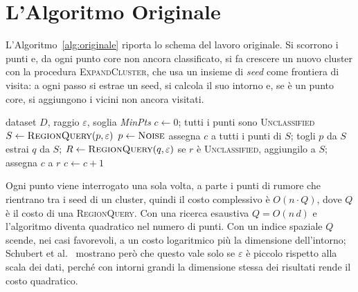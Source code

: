\section{L'Algoritmo Originale}

L'Algoritmo~\ref{alg:originale} riporta lo schema del lavoro originale. Si scorrono i punti e, da ogni punto core non ancora classificato, si fa crescere un nuovo cluster con la procedura \textsc{ExpandCluster}, che usa un insieme di \emph{seed} come frontiera di visita: a ogni passo si estrae un seed, si calcola il suo intorno e, se è un punto core, si aggiungono i vicini non ancora visitati.

\begin{algorithm}[H]
\caption{DBSCAN nella formulazione di Ester et al.~\cite{ester1996}}
\label{alg:originale}
\begin{algorithmic}[1]
\Require dataset $D$, raggio $\varepsilon$, soglia \textit{MinPts}
\State $c \gets 0$; tutti i punti sono \textsc{Unclassified}
        \State $S \gets \textsc{RegionQuery}(p, \varepsilon)$
            \State $p \gets \textsc{Noise}$ 
        \Else
            \State assegna $c$ a tutti i punti di $S$; togli $p$ da $S$
                \State estrai $q$ da $S$; $R \gets \textsc{RegionQuery}(q, \varepsilon)$
                        \State se $r$ è \textsc{Unclassified}, aggiungilo a $S$; assegna $c$ a $r$
                    \EndFor
                \EndIf
            \EndWhile
            \State $c \gets c + 1$
        \EndIf
    \EndIf
\EndFor
\end{algorithmic}
\end{algorithm}

Ogni punto viene interrogato una sola volta, a parte i punti di rumore che rientrano tra i seed di un cluster, quindi il costo complessivo è $O(n \cdot Q)$, dove $Q$ è il costo di una \textsc{RegionQuery}. Con una ricerca esaustiva $Q = O(n\,d)$ e l'algoritmo diventa quadratico nel numero di punti. Con un indice spaziale $Q$ scende, nei casi favorevoli, a un costo logaritmico più la dimensione dell'intorno; Schubert et al.~\cite{schubert2017} mostrano però che questo vale solo se $\varepsilon$ è piccolo rispetto alla scala dei dati, perché con intorni grandi la dimensione stessa dei risultati rende il costo quadratico.


